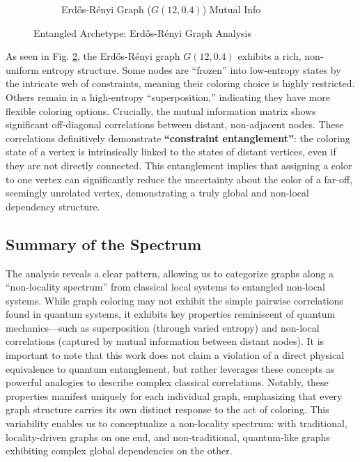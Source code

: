\documentclass[12pt, letterpaper]{article}
\begin{document}
\begin{figure}[H]
\begin{subfigure}[b]{0.48\textwidth}
        \caption{Erdős-Rényi Graph ($G(12,0.4)$) Mutual Info}
        \label{fig:erdos_mi}
    \end{subfigure}
    \caption{Entangled Archetype: Erdős-Rényi Graph Analysis}
    \label{fig:erdos_analysis}
\end{figure}

As seen in Fig. \ref{fig:erdos_analysis}, the Erdős-Rényi graph $G(12, 0.4)$ exhibits a rich, non-uniform entropy structure. Some nodes are ``frozen'' into low-entropy states by the intricate web of constraints, meaning their coloring choice is highly restricted. Others remain in a high-entropy ``superposition,'' indicating they have more flexible coloring options. Crucially, the mutual information matrix shows significant off-diagonal correlations between distant, non-adjacent nodes. These correlations definitively demonstrate \textbf{``constraint entanglement''}: the coloring state of a vertex is intrinsically linked to the states of distant vertices, even if they are not directly connected. This entanglement implies that assigning a color to one vertex can significantly reduce the uncertainty about the color of a far-off, seemingly unrelated vertex, demonstrating a truly global and non-local dependency structure.

\subsection{Summary of the Spectrum}
The analysis reveals a clear pattern, allowing us to categorize graphs along a ``non-locality spectrum'' from classical local systems to entangled non-local systems. While graph coloring may not exhibit the simple pairwise correlations found in quantum systems, it exhibits key properties reminiscent of quantum mechanics—such as superposition (through varied entropy) and non-local correlations (captured by mutual information between distant nodes). It is important to note that this work does not claim a violation of a direct physical equivalence to quantum entanglement, but rather leverages these concepts as powerful analogies to describe complex classical correlations. Notably, these properties manifest uniquely for each individual graph, emphasizing that every graph structure carries its own distinct response to the act of coloring. This variability enables us to conceptualize a non-locality spectrum: with traditional, locality-driven graphs on one end, and non-traditional, quantum-like graphs exhibiting complex global dependencies on the other.
\end{document}
